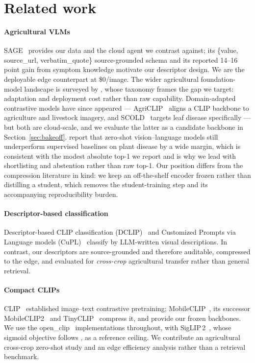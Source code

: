 \documentclass[a4paper,fleqn]{cas-dc}
\begin{document}
\section{Related work}

\paragraph{Agricultural VLMs} SAGE~\citep{arshad2026sage} provides our data and the cloud agent we contrast
against; its
\{value, source\_url, verbatim\_quote\} source-grounded schema and its reported 14--16 point gain from
symptom knowledge motivate our descriptor design. We are the deployable edge counterpart at \$0/image. The wider agricultural
foundation-model landscape is surveyed by \citet{chen2024foundation}, whose taxonomy frames
the gap we target: adaptation and deployment cost rather than raw capability. Domain-adapted
contrastive models have since appeared --- AgriCLIP~\citep{nawaz2024agriclip} aligns a CLIP
backbone to agriculture and livestock imagery, and SCOLD~\citep{scold2025} targets leaf
disease specifically --- but both are cloud-scale, and we evaluate the latter as a candidate
backbone in Section~\ref{sec:bakeoff}. \citet{lu2025vlmready} report that zero-shot
vision--language models still underperform supervised baselines on plant disease by a wide
margin, which is consistent with the modest absolute top-1 we report and is why we lead with
shortlisting and abstention rather than raw top-1. Our position differs from the compression
literature in kind: we keep an off-the-shelf encoder frozen rather than distilling a student,
which removes the student-training step and its accompanying reproducibility burden.

\paragraph{Descriptor-based classification} Descriptor-based CLIP classification
(DCLIP)~\citep{menon2023} and Customized Prompts via Language models (CuPL)~\citep{pratt2023} classify
by LLM-written visual descriptions. In contrast, our descriptors are source-grounded and therefore auditable,
compressed to the edge, and evaluated for \emph{cross-crop} agricultural transfer rather than general
retrieval.

\paragraph{Compact CLIPs} CLIP~\citep{radford2021} established image--text contrastive pretraining;
MobileCLIP~\citep{vasu2024}, its successor MobileCLIP2~\citep{mobileclip2} and
TinyCLIP~\citep{wu2023} compress it, and provide our frozen backbones. We use the
open\_clip~\citep{ilharco2021} implementations throughout, with SigLIP\,2~\citep{siglip2}, whose
sigmoid objective follows \citet{zhai2023}, as a reference ceiling. We contribute an agricultural cross-crop zero-shot study and an
edge efficiency analysis rather than a retrieval benchmark.
\end{document}
